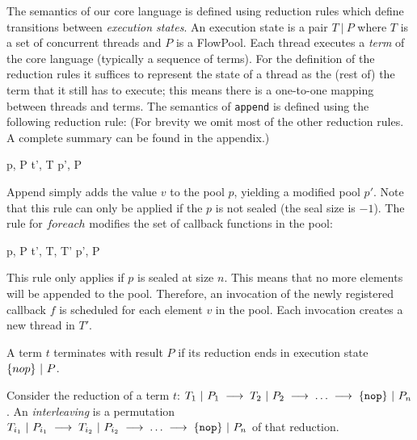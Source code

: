 The semantics of our core language is defined using reduction rules which define transitions between \emph{execution states}. An execution state is a pair $T~|~P$ where $T$ is a set of concurrent threads and $P$ is a FlowPool. Each thread executes a \emph{term} of the core language (typically a sequence of terms). For the definition of the reduction rules it suffices to represent the state of a thread as the (rest of) the term that it still has to execute; this means there is a one-to-one mapping between threads and terms. The semantics of \verb|append| is defined using the following reduction rule: (For brevity we omit most of the other reduction rules. A complete summary can be found in the appendix.)

{  {p, P} {t', T} {p', P}
}

Append simply adds the value $v$ to the pool $p$, yielding a modified pool $p'$. Note that this rule can only be applied if the $p$ is not sealed (the seal size is $-1$). The rule for $foreach$ modifies the set of callback functions in the pool:

{  {p, P} {t', T, T'} {p', P}
}

This rule only applies if $p$ is sealed at size $n$. This means that no more elements will be appended to the pool. Therefore, an invocation of the newly registered callback $f$ is scheduled for each element $v$ in the pool. Each invocation creates a new thread in $T'$.

\begin{definition}[Termination]
A term $t$ terminates with result $P$ if its reduction ends in execution state $\{nop\}~|~P$.
\end{definition}

\begin{definition}[Interleaving]
Consider the reduction of a term $t$: $T_1~|~P_1 \;\longrightarrow\; T_2~|~P_2 \;\longrightarrow\; \ldots \;\longrightarrow\; \{\texttt{nop}\}~|~P_n$. An \emph{interleaving} is a permutation 
$T_{i_1}~|~P_{i_1} \;\longrightarrow\; T_{i_2}~|~P_{i_2} \;\longrightarrow\; \ldots \;\longrightarrow\; \{\texttt{nop}\}~|~P_n$ of that reduction.
\end{definition}

